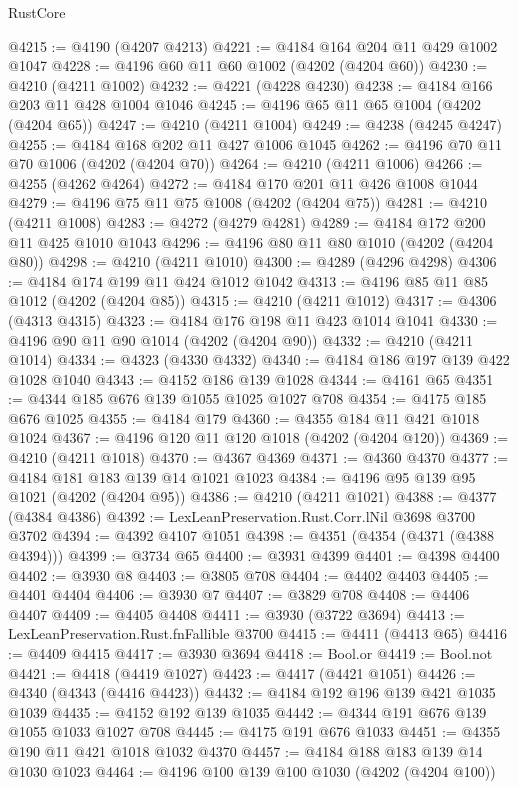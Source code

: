\begin{lexlean}{RustCore}
\begin{coremodule}
@4215 := @4190 (@4207 @4213)
@4221 := @4184 @164 @204 @11 @429 @1002 @1047
@4228 := @4196 @60 @11 @60 @1002 (@4202 (@4204 @60))
@4230 := @4210 (@4211 @1002)
@4232 := @4221 (@4228 @4230)
@4238 := @4184 @166 @203 @11 @428 @1004 @1046
@4245 := @4196 @65 @11 @65 @1004 (@4202 (@4204 @65))
@4247 := @4210 (@4211 @1004)
@4249 := @4238 (@4245 @4247)
@4255 := @4184 @168 @202 @11 @427 @1006 @1045
@4262 := @4196 @70 @11 @70 @1006 (@4202 (@4204 @70))
@4264 := @4210 (@4211 @1006)
@4266 := @4255 (@4262 @4264)
@4272 := @4184 @170 @201 @11 @426 @1008 @1044
@4279 := @4196 @75 @11 @75 @1008 (@4202 (@4204 @75))
@4281 := @4210 (@4211 @1008)
@4283 := @4272 (@4279 @4281)
@4289 := @4184 @172 @200 @11 @425 @1010 @1043
@4296 := @4196 @80 @11 @80 @1010 (@4202 (@4204 @80))
@4298 := @4210 (@4211 @1010)
@4300 := @4289 (@4296 @4298)
@4306 := @4184 @174 @199 @11 @424 @1012 @1042
@4313 := @4196 @85 @11 @85 @1012 (@4202 (@4204 @85))
@4315 := @4210 (@4211 @1012)
@4317 := @4306 (@4313 @4315)
@4323 := @4184 @176 @198 @11 @423 @1014 @1041
@4330 := @4196 @90 @11 @90 @1014 (@4202 (@4204 @90))
@4332 := @4210 (@4211 @1014)
@4334 := @4323 (@4330 @4332)
@4340 := @4184 @186 @197 @139 @422 @1028 @1040
@4343 := @4152 @186 @139 @1028
@4344 := @4161 @65
@4351 := @4344 @185 @676 @139 @1055 @1025 @1027 @708
@4354 := @4175 @185 @676 @1025
@4355 := @4184 @179
@4360 := @4355 @184 @11 @421 @1018 @1024
@4367 := @4196 @120 @11 @120 @1018 (@4202 (@4204 @120))
@4369 := @4210 (@4211 @1018)
@4370 := @4367 @4369
@4371 := @4360 @4370
@4377 := @4184 @181 @183 @139 @14 @1021 @1023
@4384 := @4196 @95 @139 @95 @1021 (@4202 (@4204 @95))
@4386 := @4210 (@4211 @1021)
@4388 := @4377 (@4384 @4386)
@4392 := LexLeanPreservation.Rust.Corr.lNil @3698 @3700 @3702
@4394 := @4392 @4107 @1051
@4398 := @4351 (@4354 (@4371 (@4388 @4394)))
@4399 := @3734 @65
@4400 := @3931 @4399
@4401 := @4398 @4400
@4402 := @3930 @8
@4403 := @3805 @708
@4404 := @4402 @4403
@4405 := @4401 @4404
@4406 := @3930 @7
@4407 := @3829 @708
@4408 := @4406 @4407
@4409 := @4405 @4408
@4411 := @3930 (@3722 @3694)
@4413 := LexLeanPreservation.Rust.fnFallible @3700
@4415 := @4411 (@4413 @65)
@4416 := @4409 @4415
@4417 := @3930 @3694
@4418 := Bool.or
@4419 := Bool.not
@4421 := @4418 (@4419 @1027)
@4423 := @4417 (@4421 @1051)
@4426 := @4340 (@4343 (@4416 @4423))
@4432 := @4184 @192 @196 @139 @421 @1035 @1039
@4435 := @4152 @192 @139 @1035
@4442 := @4344 @191 @676 @139 @1055 @1033 @1027 @708
@4445 := @4175 @191 @676 @1033
@4451 := @4355 @190 @11 @421 @1018 @1032 @4370
@4457 := @4184 @188 @183 @139 @14 @1030 @1023
@4464 := @4196 @100 @139 @100 @1030 (@4202 (@4204 @100))

\end{coremodule}
\end{lexlean}
